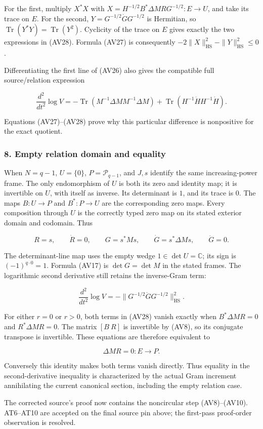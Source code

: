 For the first, multiply \(X^*X\) with \(X=H^{-1/2}B^*\Delta M RG^{-1/2}:E\to U\), and take its trace on \(E\). For the second, \(Y=G^{-1/2}\dot G G^{-1/2}\) is Hermitian, so \(\operatorname{Tr}(Y^*Y)=\operatorname{Tr}(Y^2)\). Cyclicity of the trace on \(E\) gives exactly the two expressions in (AV28). Formula (AV27) is consequently \(-2\|X\|_{\mathrm{HS}}^2-\|Y\|_{\mathrm{HS}}^2\le0\).

Differentiating the first line of (AV26) also gives the compatible full source/relation expression

\[
\frac{d^2}{dt^2}\log V
=-\operatorname{Tr}(M^{-1}\Delta M M^{-1}\Delta M)
+\operatorname{Tr}(H^{-1}\dot H H^{-1}\dot H).
\tag{AV29}
\]

Equations (AV27)--(AV28) prove why this particular difference is nonpositive for the exact quotient.

\subsubsection{8. Empty relation domain and equality}\label{endpoint-variation_review--empty-relation-domain-and-equality}

When \(N=q-1\), \(U=\{0\}\), \(P=\mathcal P_{q-1}\), and \(J,s\) identify the same increasing-power frame. The only endomorphism of \(U\) is both its zero and identity map; it is invertible on \(U\), with itself as inverse. Its determinant is \(1\), and its trace is \(0\). The maps \(B:U\to P\) and \(B^*:P\to U\) are the corresponding zero maps. Every composition through \(U\) is the correctly typed zero map on its stated exterior domain and codomain. Thus

\[
R=s,\qquad \dot R=0,\qquad
G=s^*Ms,\qquad \dot G=s^*\Delta M s,\qquad \ddot G=0.
\tag{AV30}
\]

The determinant-line map uses the empty wedge \(1\in\det U=\mathbb C\); its sign is \((-1)^{q\cdot0}=1\). Formula (AV17) is \(\det G=\det M\) in the stated frames. The logarithmic second derivative still retains the inverse-Gram term:

\[
\frac{d^2}{dt^2}\log V
=-\|G^{-1/2}\dot G G^{-1/2}\|_{\mathrm{HS}}^2.
\tag{AV31}
\]

For either \(r=0\) or \(r>0\), both terms in (AV28) vanish exactly when \(B^*\Delta M R=0\) and \(R^*\Delta M R=0\). The matrix \([B\ R]\) is invertible by (AV8), so its conjugate transpose is invertible. These equations are therefore equivalent to

\[
\Delta M R=0:E\longrightarrow P.
\tag{AV32}
\]

Conversely this identity makes both terms vanish directly. Thus equality in the second-derivative inequality is characterized by the actual Gram increment annihilating the current canonical section, including the empty relation case.

The corrected source's proof now contains the noncircular step (AV8)--(AV10). AT6--AT10 are accepted on the final source pin above; the first-pass proof-order observation is resolved.
